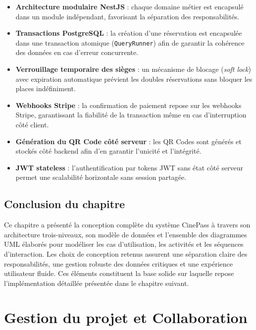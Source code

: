 \documentclass[12pt]{report}
\begin{document}
\begin{itemize}
    \item \textbf{Architecture modulaire NestJS} : chaque domaine métier est
          encapsulé dans un module indépendant, favorisant la séparation des
          responsabilités.
    \item \textbf{Transactions PostgreSQL} : la création d'une réservation est
          encapsulée dans une transaction atomique (\texttt{QueryRunner}) afin de
          garantir la cohérence des données en cas d'erreur concurrente.
    \item \textbf{Verrouillage temporaire des sièges} : un mécanisme de blocage
          (\textit{soft lock}) avec expiration automatique prévient les doubles
          réservations sans bloquer les places indéfiniment.
    \item \textbf{Webhooks Stripe} : la confirmation de paiement repose sur les
          webhooks Stripe, garantissant la fiabilité de la transaction même en cas
          d'interruption côté client.
    \item \textbf{Génération du QR Code côté serveur} : les QR Codes sont générés
          et stockés côté backend afin d'en garantir l'unicité et l'intégrité.
    \item \textbf{JWT stateless} : l'authentification par tokens JWT sans état côté
          serveur permet une scalabilité horizontale sans session partagée.
\end{itemize}

\section{Conclusion du chapitre}

Ce chapitre a présenté la conception complète du système CinePass à travers son
architecture trois-niveaux, son modèle de données et l'ensemble des diagrammes UML
élaborés pour modéliser les cas d'utilisation, les activités et les séquences
d'interaction. Les choix de conception retenus assurent une séparation claire des
responsabilités, une gestion robuste des données critiques et une expérience
utilisateur fluide. Ces éléments constituent la base solide sur laquelle repose
l'implémentation détaillée présentée dans le chapitre suivant.
\chapter{Gestion du projet et Collaboration}
 
\end{document}
